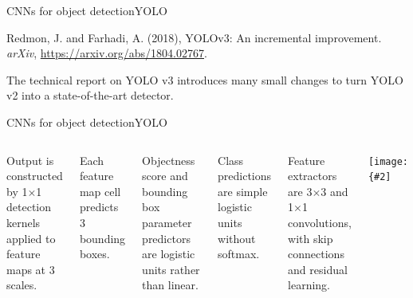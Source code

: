\documentclass[aspectratio=169]{beamer}
\newcommand{\myfig}[3]{\centerline{\texttt{[image: \{\#2]}}}
\begin{document}
\begin{frame}{CNNs for object detection}{YOLO}

  Redmon, J. and Farhadi, A. (2018), YOLOv3: An incremental
  improvement.  \textit{arXiv},
  \url{https://arxiv.org/abs/1804.02767}.

  \medskip

  The technical report on YOLO v3 introduces many small changes to turn
  YOLO v2 into a state-of-the-art detector.
  
\end{frame}


\begin{frame}{CNNs for object detection}{YOLO}

  \begin{columns}

    \column{2.5in}
    
    Output is constructed by 1$\times$1 detection kernels applied to
    feature maps at 3 scales.

    \medskip

    Each feature map cell predicts 3 bounding boxes.

    \medskip

    Objectness score and bounding box parameter predictors are
    logistic units rather than linear.
    
    \medskip

    Class predictions are simple logistic units without softmax.

    \medskip

    Feature extractors are 3$\times$3 and 1$\times$1 convolutions,
    with skip connections and residual learning.

    \column{2.2in}

    \myfig{1.8in}{yolo-bb}{\begin{minipage}{2in}\url{https://blog.paperspace.com/how-to-implement-a-yolo-object-}\\\url{detector-in-pytorch/}\end{minipage}}

\end{columns}

\end{frame}
\end{document}
